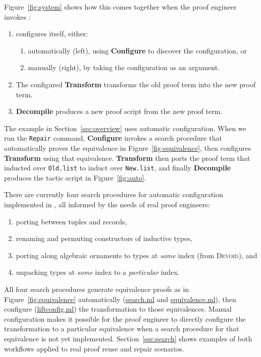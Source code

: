 Figure~\ref{fig:system} shows how this comes together when the proof engineer invokes \toolname:

\begin{enumerate}
\item \toolname configures itself, either:
\begin{enumerate}
\item automatically (left), using \textbf{Configure} to discover the configuration, or
\item manually (right), by taking the configuration as an argument.
\end{enumerate}
\item The configured \textbf{Transform} transforms the old proof term into the new proof term.
\item \textbf{Decompile} produces a new proof script from the new proof term.
\end{enumerate}

The example in Section~\ref{sec:overview} uses automatic configuration. When we run the \lstinline{Repair} command,
\textbf{Configure} invokes a search procedure that automatically proves the equivalence in Figure~\ref{fig:equivalence},
then configures \textbf{Transform} using that equivalence.
\textbf{Transform} then ports the proof term that inducted over \lstinline{Old.list}
to induct over \lstinline{New.list}, and finally
\textbf{Decompile} produces the tactic script in Figure~\ref{fig:auto}.

There are currently four search procedures for automatic configuration implemented in \toolname,
all informed by the needs of real proof engineers:

\begin{enumerate}
\item porting between tuples and records,
\item renaming and permuting constructors of inductive types,
\item porting along algebraic ornaments to types at \textit{some} index (from \textsc{Devoid}), and
\item unpacking types at \textit{some} index to a \textit{particular} index.
\end{enumerate}
All four search procedures generate equivalence proofs as in Figure~\ref{fig:equivalence} automatically (\href{https://github.com/uwplse/pumpkin-pi/blob/master/plugin/src/automation/search/search.ml}{search.ml} and \href{https://github.com/uwplse/pumpkin-pi/blob/master/plugin/src/automation/search/equivalence.ml}{equivalence.ml}),
then configure (\href{https://github.com/uwplse/pumpkin-pi/blob/master/plugin/src/automation/lift/liftconfig.ml}{liftconfig.ml}) the transformation to those equivalences.
Manual configuration makes it possible
for the proof engineer to directly configure the transformation to a particular equivalence
when a search procedure for that equivalence is not yet implemented.
Section~\ref{sec:search} shows examples of both workflows applied to real proof reuse and repair scenarios.




